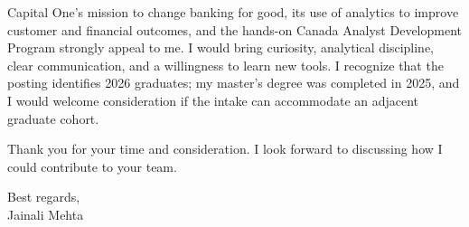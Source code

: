 \documentclass[letterpaper,10pt]{article}
\begin{document}
Capital One's mission to change banking for good, its use of analytics to improve customer and financial outcomes, and the hands-on Canada Analyst Development Program strongly appeal to me. I would bring curiosity, analytical discipline, clear communication, and a willingness to learn new tools. I recognize that the posting identifies 2026 graduates; my master's degree was completed in 2025, and I would welcome consideration if the intake can accommodate an adjacent graduate cohort.

Thank you for your time and consideration. I look forward to discussing how I could contribute to your team.

Best regards,\\[8pt]
Jainali Mehta
\end{document}
